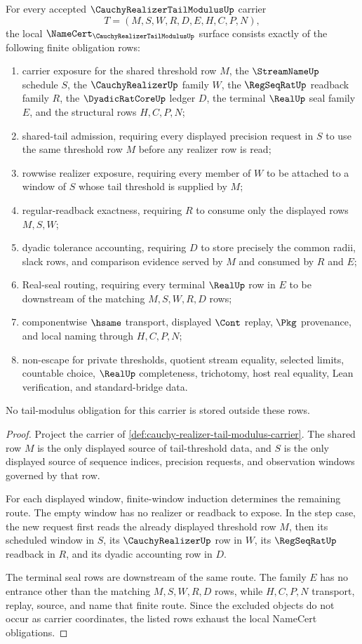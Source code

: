 \begin{theorem}
\label{thm:cauchy-realizer-tail-modulus-namecert-obligations}
For every accepted $\CauchyRealizerTailModulusUp$ carrier
$$
T=(M,S,W,R,D,E,H,C,P,N),
$$
the local $\NameCert_{\CauchyRealizerTailModulusUp}$ surface consists exactly of the following finite obligation rows:
\begin{enumerate}
\item carrier exposure for the shared threshold row $M$, the $\StreamNameUp$ schedule $S$, the $\CauchyRealizerUp$ family $W$, the $\RegSeqRatUp$ readback family $R$, the $\DyadicRatCoreUp$ ledger $D$, the terminal $\RealUp$ seal family $E$, and the structural rows $H,C,P,N$;
\item shared-tail admission, requiring every displayed precision request in $S$ to use the same threshold row $M$ before any realizer row is read;
\item rowwise realizer exposure, requiring every member of $W$ to be attached to a window of $S$ whose tail threshold is supplied by $M$;
\item regular-readback exactness, requiring $R$ to consume only the displayed rows $M,S,W$;
\item dyadic tolerance accounting, requiring $D$ to store precisely the common radii, slack rows, and comparison evidence served by $M$ and consumed by $R$ and $E$;
\item Real-seal routing, requiring every terminal $\RealUp$ row in $E$ to be downstream of the matching $M,S,W,R,D$ rows;
\item componentwise $\hsame$ transport, displayed $\Cont$ replay, $\Pkg$ provenance, and local naming through $H,C,P,N$;
\item non-escape for private thresholds, quotient stream equality, selected limits, countable choice, $\RealUp$ completeness, trichotomy, host real equality, Lean verification, and standard-bridge data.
\end{enumerate}
No tail-modulus obligation for this carrier is stored outside these rows.
\end{theorem}
\begin{proof}
Project the carrier of \autoref{def:cauchy-realizer-tail-modulus-carrier}. The shared row $M$ is the only displayed source of tail-threshold data, and $S$ is the only displayed source of sequence indices, precision requests, and observation windows governed by that row.

For each displayed window, finite-window induction determines the remaining route. The empty window has no realizer or readback to expose. In the step case, the new request first reads the already displayed threshold row $M$, then its scheduled window in $S$, its $\CauchyRealizerUp$ row in $W$, its $\RegSeqRatUp$ readback in $R$, and its dyadic accounting row in $D$.

The terminal seal rows are downstream of the same route. The family $E$ has no entrance other than the matching $M,S,W,R,D$ rows, while $H,C,P,N$ transport, replay, source, and name that finite route. Since the excluded objects do not occur as carrier coordinates, the listed rows exhaust the local NameCert obligations.
\end{proof}


